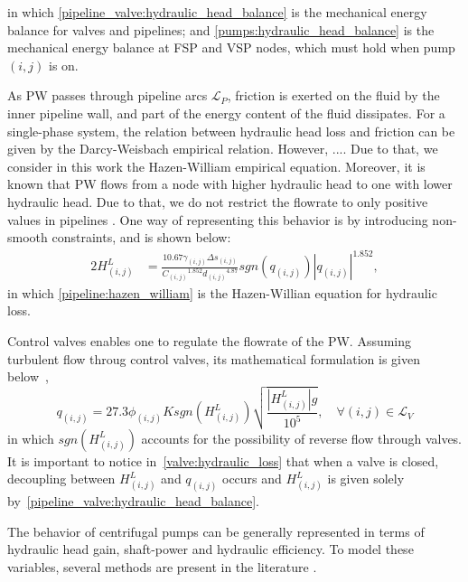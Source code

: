    in which \eqref{pipeline_valve:hydraulic_head_balance} is the mechanical energy balance for valves and pipelines; and \eqref{pumps:hydraulic_head_balance} is the mechanical energy balance at FSP and VSP nodes, which must hold when pump $(i,j)$ is on.
    \par As PW passes through pipeline arcs $\mathcal{L}_P$, friction is exerted on the fluid by the inner pipeline wall, and part of the energy content of the fluid dissipates. For a single-phase system, the relation between hydraulic head loss and friction can be given by the Darcy-Weisbach empirical relation. However, .... Due to that, we consider in this work the Hazen-William empirical equation.
    Moreover, it is known that PW flows from a node with higher hydraulic head to one with lower hydraulic head. Due to that, we do not restrict the flowrate to only positive values in pipelines \citep{Gleixner2012}. One way of representing this behavior is by introducing non-smooth constraints, and is shown below:
    \begin{alignat}{2}
        H^L_{(i,j)} &= 
            \frac{10.67 \gamma_{(i,j)} \Delta s_{(i,j)}}{{C_{(i,j)}}^{1.852}{d_{(i,j)}}^{4.87}} sgn(q_{(i,j)})|q_{(i,j)}|^{1.852}, \label{pipeline:hazen_william}
    \end{alignat}
    in which \eqref{pipeline:hazen_william} is the Hazen-Willian equation for hydraulic loss. 
    \par Control valves enables one to regulate the flowrate of the PW. Assuming turbulent flow throug control valves, its mathematical formulation is given below~\citep{Fisher2005},
    \begin{equation}
        q_{(i,j)} =  27.3 \phi_{(i,j)} K sgn(H^L_{(i,j)})\sqrt{\frac{|H^L_{(i,j)}|g}{10^5}}, \quad \forall {(i,j)} \in \mathcal{L}_V \label{valve:hydraulic_loss}
    \end{equation}
    in which $sgn(H^L_{(i,j)})$ accounts for the possibility of reverse flow through valves. It is important to notice in~\eqref{valve:hydraulic_loss} that when a valve is closed, decoupling between $H^L_{(i,j)}$ and $q_{(i,j)}$ occurs and $H^L_{(i,j)}$ is given solely by~\eqref{pipeline_valve:hydraulic_head_balance}.
    \par The behavior of centrifugal pumps can be generally represented in terms of hydraulic head gain, shaft-power and hydraulic efficiency. To model these variables, several methods are present in the literature \citep{Shankar2016}. 
